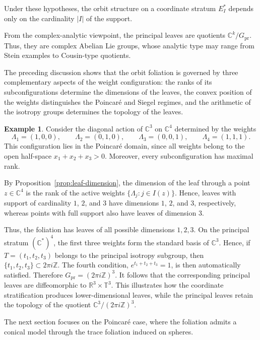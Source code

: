 \documentclass[11pt]{amsart}
\theoremstyle{definition}
\newtheorem{example}[theorem]{Example}
\theoremstyle{remark}
\newcommand{\Z}{\mathbb{Z}}
\newcommand{\C}{\mathbb{C}}
\newcommand{\R}{\mathbb{R}}
\newcommand{\T}{\mathbb{T}}
\newcommand{\stratSS}[1]{E_{#1}^*}
\begin{document}
Under these hypotheses, the orbit structure on a coordinate stratum $\stratSS{I}$ depends only on the cardinality $|I|$ of the support.

From the complex-analytic viewpoint, the principal leaves are quotients $\C^k/G_{\mathrm{pr}}$.
Thus, they are complex Abelian Lie groups, whose analytic type may range from Stein examples to Cousin-type quotients.

The preceding discussion shows that the orbit foliation is governed by three complementary aspects of the weight configuration: the ranks of its subconfigurations determine the dimensions of the leaves, the convex position of the weights distinguishes the Poincaré and Siegel regimes, and the arithmetic of the isotropy groups determines the topology of the leaves.

\begin{example}\label{ex:C3C4}
	Consider the diagonal action of $\C^3$ on $\C^4$ determined by the weights
	\[
		\Lambda_1=(1,0,0),\qquad \Lambda_2=(0,1,0),\qquad \Lambda_3=(0,0,1),\qquad \Lambda_4=(1,1,1).
	\]
	This configuration lies in the Poincaré domain, since all weights belong
	to the open half-space $x_1+x_2+x_3>0$.
	Moreover, every subconfiguration has maximal rank.

	By Proposition~\ref{prop:leaf-dimension}, the dimension of the leaf through a point $z\in\C^4$ is the rank of the active weights $\{\Lambda_j:j\in I(z)\}$.
	Hence, leaves with support of cardinality $1$, $2$, and $3$ have dimensions $1$, $2$, and $3$, respectively, whereas points with full support also have leaves of dimension $3$.

	Thus, the foliation has leaves of all possible dimensions \(1,2,3\).
	On the principal stratum \((\C^*)^4\), the first three weights form the standard basis of \(\C^3\).
	Hence, if \(T=(t_1,t_2,t_3)\) belongs to the principal isotropy subgroup, then $\{ t_1,t_2,t_3 \} \subset 2\pi i\Z$.
	The fourth condition, $e^{t_1+t_2+t_3}=1$, is then automatically satisfied.
	Therefore $G_{\mathrm{pr}}=(2\pi i\Z)^3$.
	It follows that the corresponding principal leaves are diffeomorphic to $\R^3\times\T^3$.
	This illustrates how the coordinate stratification produces lower-dimensional leaves, while the principal leaves retain the topology of the quotient $\C^3/(2\pi i\Z)^3$.
\end{example}

The next section focuses on the Poincaré case, where the foliation admits a conical model through the trace foliation induced on spheres.
\end{document}
